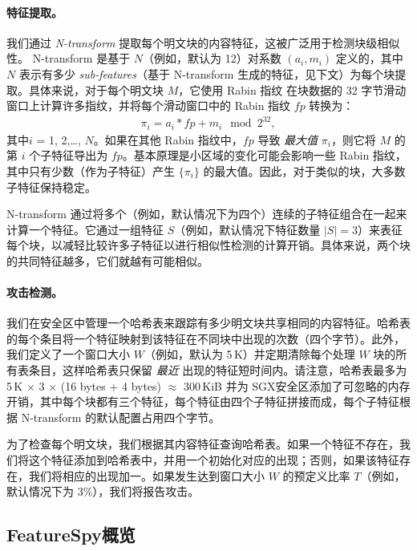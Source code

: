 \paragraph{特征提取。}
我们通过 {\em N-transform} \cite{shilane12} 提取每个明文块的内容特征，这被广泛用于检测块级相似性。 N-transform 是基于 $N$（例如，默认为 12）对系数 $(a_i, m_i)$ 定义的，其中 $N$ 表示有多少 {\em sub-features}（基于 N-transform 生成的特征，见下文）为每个块提取。具体来说，对于每个明文块 $M$，它使用 Rabin 指纹 \cite{rabin81} 在块数据的 32 字节滑动窗口上计算许多指纹，并将每个滑动窗口中的 Rabin 指纹 $fp$ 转换为：
\begin{eqnarray}
  \label{eq:feature}
  \pi_i = a_i * fp + m_i \mod 2^{32},
\end{eqnarray}
其中$i$ = 1, 2,\ldots, $N$。如果在其他 Rabin 指纹中，$fp$ 导致 {\em 最大值} $\pi_i$，则它将 $M$ 的第 $i$ 个子特征导出为 $fp$。基本原理是小区域的变化可能会影响一些 Rabin 指纹，其中只有少数（作为子特征）产生 $\{\pi_i\}$ 的最大值。因此，对于类似的块，大多数子特征保持稳定。

N-transform 通过将多个（例如，默认情况下为四个）连续的子特征组合在一起来计算一个特征。它通过一组特征 $S$（例如，默认情况下特征数量 $|S| = 3$）来表征每个块，以减轻比较许多子特征以进行相似性检测的计算开销。具体来说，两个块的共同特征越多，它们就越有可能相似。


\paragraph{攻击检测。}
我们在安全区中管理一个哈希表来跟踪有多少明文块共享相同的内容特征。哈希表的每个条目将一个特征映射到该特征在不同块中出现的次数（四个字节）。此外，我们定义了一个窗口大小 $W$（例如，默认为 5\,K）并定期清除每个处理 $W$ 块的所有表条目，这样哈希表只保留 {\em 最近} 出现的特征短时间内。请注意，哈希表最多为 5\,K $\times$ 3 $\times$ (16 bytes + 4 bytes) $\approx$ 300\,KiB 并为 SGX安全区添加了可忽略的内存开销，其中每个块都有三个特征，每个特征由四个子特征拼接而成，每个子特征根据 N-transform 的默认配置占用四个字节。

为了检查每个明文块，我们根据其内容特征查询哈希表。如果一个特征不存在，我们将这个特征添加到哈希表中，并用一个初始化对应的出现；否则，如果该特征存在，我们将相应的出现加一。如果发生达到窗口大小 $W$ 的预定义比率 $T$（例如，默认情况下为 3\%），我们将报告攻击。



\subsection{FeatureSpy概览}
\label{sub:secure_design}

